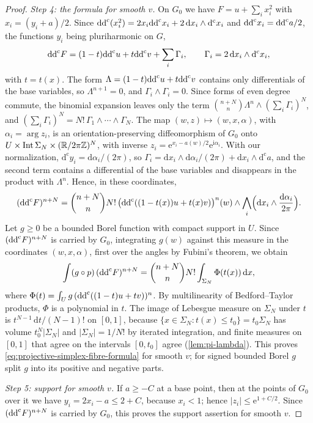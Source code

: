 \begin{proof}
\emph{Step 4: the formula for smooth $v$.} On $G_0$ we have $F=u+\sum_ix_i^2$ with $x_i=(y_i+a)/2$. Since $\mathrm{dd}^{\mathrm{c}}(x_i^2)=2x_i\mathrm{dd}^{\mathrm{c}} x_i+2\,\mathrm dx_i\wedge\mathrm d^{\mathrm c}x_i$ and $\mathrm{dd}^{\mathrm{c}} x_i=\mathrm{dd}^{\mathrm{c}} a/2$, the functions $y_i$ being pluriharmonic on $G$,
\[
 \mathrm{dd}^{\mathrm{c}} F=(1-t)\mathrm{dd}^{\mathrm{c}} u+t\mathrm{dd}^{\mathrm{c}} v+\sum_i\Gamma_i,\qquad \Gamma_i=2\,\mathrm dx_i\wedge\mathrm d^{\mathrm c}x_i,
\]
with $t=t(x)$. The form $\Lambda=(1-t)\mathrm{dd}^{\mathrm{c}} u+t\mathrm{dd}^{\mathrm{c}} v$ contains only differentials of the base variables, so $\Lambda^{n+1}=0$, and $\Gamma_i\wedge\Gamma_i=0$. Since forms of even degree commute, the binomial expansion leaves only the term $\binom{n+N}{n}\Lambda^n\wedge(\sum_i\Gamma_i)^N$, and $(\sum_i\Gamma_i)^N=N!\,\Gamma_1\wedge\cdots\wedge\Gamma_N$. The map $(w,z)\mapsto(w,x,\alpha)$, with $\alpha_i=\arg z_i$, is an orientation-preserving diffeomorphism of $G_0$ onto $U\times\operatorname{Int}\Sigma_N\times(\mathbb R/2\pi\mathbb Z)^N$, with inverse $z_i=\mathrm e^{x_i-a(w)/2}\mathrm e^{\mathrm i\alpha_i}$. With our normalization, $\mathrm d^{\mathrm c}y_i=\mathrm d\alpha_i/(2\pi)$, so $\Gamma_i=\mathrm dx_i\wedge\mathrm d\alpha_i/(2\pi)+\mathrm dx_i\wedge\mathrm d^{\mathrm c}a$, and the second term contains a differential of the base variables and disappears in the product with $\Lambda^n$. Hence, in these coordinates,
\[
 (\mathrm{dd}^{\mathrm{c}} F)^{n+N}=\binom{n+N}{n}N!\,\bigl(\mathrm{dd}^{\mathrm{c}}((1-t(x))u+t(x)v)\bigr)^n(w)\wedge\bigwedge_i\Bigl(\mathrm dx_i\wedge\frac{\mathrm d\alpha_i}{2\pi}\Bigr).
\]
Let $g\geq0$ be a bounded Borel function with compact support in $U$. Since $(\mathrm{dd}^{\mathrm{c}} F)^{n+N}$ is carried by $G_0$, integrating $g(w)$ against this measure in the coordinates $(w,x,\alpha)$, first over the angles by Fubini's theorem, we obtain
\[
 \int(g\circ p)\,(\mathrm{dd}^{\mathrm{c}} F)^{n+N}=\binom{n+N}{n}N!\int_{\Sigma_N}\Phi(t(x))\,\mathrm dx,
\]
where $\Phi(t)=\int_Ug\,(\mathrm{dd}^{\mathrm{c}}((1-t)u+tv))^n$. By multilinearity of Bedford--Taylor products, $\Phi$ is a polynomial in $t$. The image of Lebesgue measure on $\Sigma_N$ under $t$ is $t^{N-1}\,\mathrm dt/(N-1)!$ on $[0,1]$, because $\{x\in\Sigma_N:t(x)\leq t_0\}=t_0\Sigma_N$ has volume $t_0^N|\Sigma_N|$ and $|\Sigma_N|=1/N!$ by iterated integration, and finite measures on $[0,1]$ that agree on the intervals $[0,t_0]$ agree (\cref{lem:pi-lambda}). This proves \eqref{eq:projective-simplex-fibre-formula} for smooth $v$; for signed bounded Borel $g$ split $g$ into its positive and negative parts.

\emph{Step 5: support for smooth $v$.} If $a\geq-C$ at a base point, then at the points of $G_0$ over it we have $y_i=2x_i-a\leq2+C$, because $x_i<1$; hence $|z_i|\leq\mathrm e^{1+C/2}$. Since $(\mathrm{dd}^{\mathrm{c}} F)^{n+N}$ is carried by $G_0$, this proves the support assertion for smooth $v$.


\end{proof}

